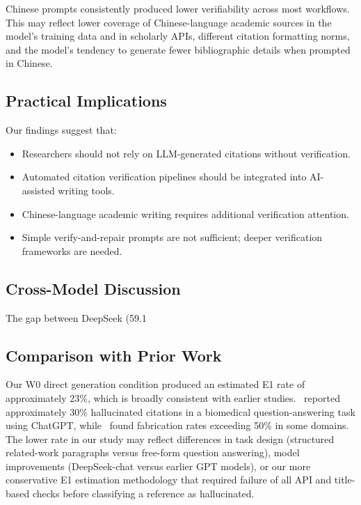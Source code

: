 \documentclass[11pt,a4paper]{article}
\begin{document}
Chinese prompts consistently produced lower verifiability across most workflows. This may reflect lower coverage of Chinese-language academic sources in the model's training data and in scholarly APIs, different citation formatting norms, and the model's tendency to generate fewer bibliographic details when prompted in Chinese.

\subsection{Practical Implications}

Our findings suggest that:

\begin{itemize}[nosep]
    \item Researchers should not rely on LLM-generated citations without verification.
    \item Automated citation verification pipelines should be integrated into AI-assisted writing tools.
    \item Chinese-language academic writing requires additional verification attention.
    \item Simple verify-and-repair prompts are not sufficient; deeper verification frameworks are needed.
\end{itemize}


\subsection{Cross-Model Discussion}

The gap between DeepSeek (59.1%

\subsection{Comparison with Prior Work}

Our W0 direct generation condition produced an estimated E1 rate of approximately 23\%, which is broadly consistent with earlier studies.~\cite{zuccon2023hallucinates} reported approximately 30\% hallucinated citations in a biomedical question-answering task using ChatGPT, while~\cite{walters2023fabrication} found fabrication rates exceeding 50\% in some domains. The lower rate in our study may reflect differences in task design (structured related-work paragraphs versus free-form question answering), model improvements (DeepSeek-chat versus earlier GPT models), or our more conservative E1 estimation methodology that required failure of all API and title-based checks before classifying a reference as hallucinated.
\end{document}

